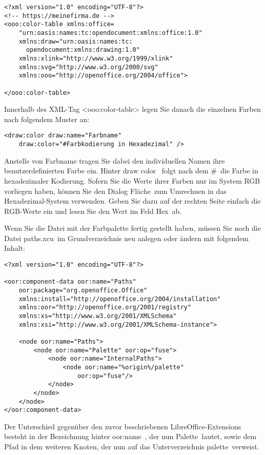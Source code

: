\documentclass[a4paper,10pt,pagesize,titlepage]{scrbook}
\begin{document}
\begin{lstlisting}
<?xml version="1.0" encoding="UTF-8"?>
<!-- https://meinefirma.de -->
<ooo:color-table xmlns:office=
    "urn:oasis:names:tc:opendocument:xmlns:office:1.0"
    xmlns:draw="urn:oasis:names:tc:
      opendocument:xmlns:drawing:1.0"
    xmlns:xlink="http://www.w3.org/1999/xlink"
    xmlns:svg="http://www.w3.org/2000/svg"
    xmlns:ooo="http://openoffice.org/2004/office">
    
</ooo:color-table>
\end{lstlisting}

Innerhalb des XML-Tag <ooo:color-table> legen Sie danach die einzelnen Farben nach folgendem Muster an:

\begin{lstlisting}
<draw:color draw:name="Farbname" 
    draw:color="#Farbkodierung in Hexadezimal" />
\end{lstlisting}

Anstelle von Farbname tragen Sie dabei den individuellen Namen ihre benutzerdefinierten Farbe ein. Hinter \glqq draw color\grqq~ folgt nach dem \glqq \#\grqq~die Farbe in hexadezimaler Kodierung. Sofern Sie die Werte ihrer Farben nur im System RGB vorliegen haben, können Sie den Dialog \glqq Fläche\grqq~zum Umrechnen in das Hexadezimal-System verwenden. Geben Sie dazu auf der rechten Seite einfach die RGB-Werte ein und lesen Sie den Wert im Feld \glqq Hex\grqq~ab.

Wenn Sie die Datei mit der Farbpalette fertig gestellt haben, müssen Sie noch die Datei \glqq paths.xcu\grqq~im Grundverzeichnis neu anlegen oder ändern mit folgendem Inhalt:


\begin{lstlisting}
<?xml version="1.0" encoding="UTF-8"?>

<oor:component-data oor:name="Paths" 
    oor:package="org.openoffice.Office" 
    xmlns:install="http://openoffice.org/2004/installation" 
    xmlns:oor="http://openoffice.org/2001/registry"
    xmlns:xs="http://www.w3.org/2001/XMLSchema" 
    xmlns:xsi="http://www.w3.org/2001/XMLSchema-instance">

    <node oor:name="Paths">
        <node oor:name="Palette" oor:op="fuse">
            <node oor:name="InternalPaths">
                <node oor:name="%origin%/palette" 
                    oor:op="fuse"/>
            </node>
        </node>
    </node>
</oor:component-data>
\end{lstlisting}

Der Unterschied gegenüber den zuvor beschriebenen LibreOffice-Extensions besteht in der Bezeichnung hinter \glqq oor:name\grqq~, der nun \glqq Palette\grqq~lautet, sowie dem Pfad in dem weiteren Knoten, der nun auf das Unterverzeichnis \glqq palette\grqq~verweist.
\end{document}
